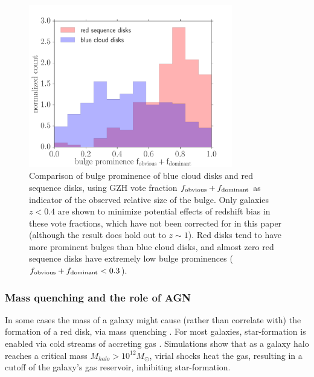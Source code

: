 \documentclass[useAMS,usenatbib]{mn2e}
\begin{document}
\begin{figure}
\centering
\includegraphics[width=3.5in]{figures/bulge_comparison.pdf}
\caption{Comparison of bulge prominence of blue cloud disks and red sequence disks, using GZH vote fraction $f_{\rm obvious} + f_{\rm dominant}$ as indicator of the observed relative size of the bulge. Only galaxies $z<0.4$ are shown to minimize potential effects of redshift bias in these vote fractions, which have not been corrected for in this paper (although the result does hold out to $z\sim1$). Red disks tend to have more prominent bulges than blue cloud disks, and almost zero red sequence disks have extremely low bulge prominences ($f_{\rm obvious} + f _{\rm dominant} < 0.3$).}
\label{fig:bulge}
\end{figure}
  
\subsubsection{Mass quenching and the role of AGN}
In some cases the mass of a galaxy might cause (rather than correlate with) the formation of a red disk, via mass quenching \citep{Kormendy2004,Peng2010,Schawinski2014,Smethurst2017}. For most galaxies, star-formation is enabled via cold streams of accreting gas \citet{Dekel2006}. Simulations \citep{Birnboim2003,Cattaneo2006} show that as a galaxy halo reaches a critical mass $M_{halo}>10^{12}M_{\odot}$, virial shocks heat the gas, resulting in a cutoff of the galaxy's gas reservoir, inhibiting star-formation. 
\end{document}
